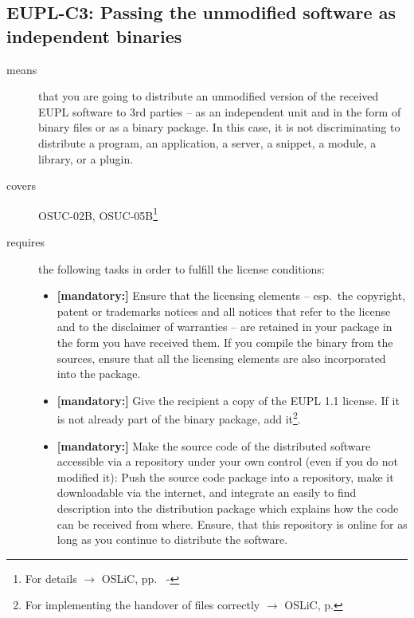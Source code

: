 \subsection{EUPL-C3: Passing the unmodified software as independent binaries} 
\label{OSUC-02B-EUPL} \label{OSUC-05B-EUPL}

\begin{description}

\item[means] that you are going to distribute an unmodified version of the
received EUPL software to 3rd parties -- as an independent unit and in the form
of binary files or as a binary package. In this case, it is not discriminating
to distribute a program, an application, a server, a snippet, a module, a
library, or a plugin.

\item[covers] OSUC-02B, OSUC-05B\footnote{For details $\rightarrow$
OSLiC, pp.\ \pageref{OSUC-02B-DEF} - \pageref{OSUC-05B-DEF}}

\item[requires] the following tasks in order to fulfill the license conditions:
\begin{itemize}
  
  \item \textbf{[mandatory:]} Ensure that the licensing elements -- esp.\ the
  copyright, patent or trademarks notices and all notices that refer to the
  license and to the disclaimer of warranties -- are retained in your package in
  the form you have received them. If you compile the binary from the sources,
  ensure that all the licensing elements are also incorporated into the package.
  
  \item \textbf{[mandatory:]} Give the recipient a copy of the EUPL 1.1
  license. If it is not already part of the binary package, add
  it\footnote{For implementing the handover of files correctly $\rightarrow$
  OSLiC, p. \pageref{DistributingFilesHint}}.

  \item \textbf{[mandatory:]} Make the source code of the distributed software
  accessible via a repository under your own control (even if you do not
  modified it): Push the source code package into a repository, make it
  downloadable via the internet, and integrate an easily to find description
  into the distribution package which explains how the code can be received from
  where. Ensure, that this repository is online for as long as you continue to
  distribute the software.
  

\end{itemize}
\end{description}
